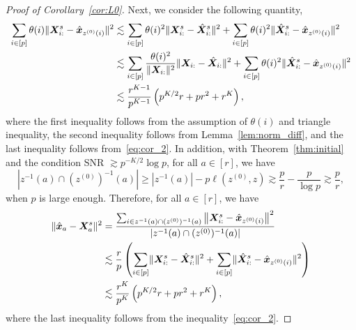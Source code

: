 \documentclass[lettersize,onecolumn,journal]{IEEEtran}
\theoremstyle{definition}
\theoremstyle{definition}
\newcommand{\of}[1]{\left(#1\right)}
\begin{document}
\begin{proof} [Proof of Corollary~\ref{cor:L0}]
Next, we consider the following quantity,
\begin{align}
    \sum_{i \in [p]} \theta(i) \onormSize{}{ \mX_{i:}^s - \hat \mx_{z^{(0)}(i)}}^2 &\lesssim \sum_{i \in [p]} \theta(i)^2 \onormSize{}{\mX_{i:}^s - \hat \mX_{i:}^s}^2 + \sum_{i \in [p]} \theta(i)^2 \onormSize{}{\hat \mX_{i:}^s - \hat \mx_{z^{(0)}(i)} }^2\\
    & \lesssim \sum_{i \in [p]} \frac{ \theta(i)^2}{ \onormSize{}{\mX_{i:}}^2} \onormSize{}{\mX_{i:}  - \hat \mX_{i:}}^2 +  \sum_{i \in [p]} \theta(i)^2 \onormSize{}{\hat \mX_{i:}^s - \hat \mx_{z^{(0)}(i)} }^2\\
    & \lesssim \frac{r^{K-1}}{p^{K-1}} \of{ p^{K/2}r + pr^2 + r^K} ,\label{eq:cor_3}
\end{align}
where the first inequality follows from the assumption of $\theta(i)$ and triangle inequality, the second inequality follows from Lemma~\ref{lem:norm_diff}, and the last inequality follows from~\eqref{eq:cor_2}. In addition, with Theorem~\ref{thm:initial} and the condition SNR $\gtrsim p^{-K/2} \log p$, for all $a \in [r]$, we have
\begin{equation}
    |z^{-1}(a) \cap (z^{(0)})^{-1} (a)| \geq |z^{-1}(a)| - p\ell(z^{(0)} ,  z) \gtrsim \frac{p}{r} - \frac{p}{\log p} \gtrsim \frac{p}{r},
\end{equation}
when $p$ is large enough. Therefore, for all $a \in [r]$, we have 
\begin{align}
       \onormSize{}{ \hat \mx_{a} - \mX_{a}^s  }^2  &= \frac{ \sum_{i \in z^{-1}(a) \cap (z^{(0)})^{-1} (a) } \onorm{ \mX_{i:}^s - \hat \mx_{z^{(0)}(i)}}^2 }{|z^{-1}(a) \cap (z^{(0)})^{-1} (a) |}  \\
       & \lesssim \frac{r}{p} \of{  \sum_{i \in [p]} \onormSize{}{ \mX_{i:}^s - \hat \mX_{i:}^s }^2 + \sum_{i \in [p]} \onormSize{}{\hat \mX_{i:}^s - \hat \mx_{z^{(0)}(i)}}^2 } \\
       & \lesssim  \frac{r^{K}}{p^{K}}\of{ p^{K/2}r + pr^2 + r^K}, \label{eq:cor_4}
\end{align}
where the last inequality follows from the inequality~\eqref{eq:cor_2}.


\end{proof}
\end{document}
